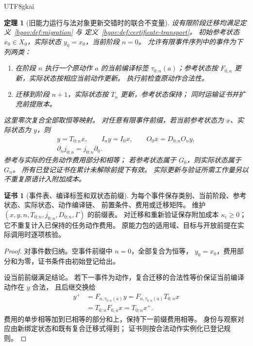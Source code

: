 \documentclass[12pt,a4paper,openany,notitlepage]{report}
\theoremstyle{plain}
\newtheorem{theorem}{定理}[chapter]
\theoremstyle{definition}
\newtheorem*{certificate}{证书}
\theoremstyle{remark}
\begin{document}
\begin{CJK*}{UTF8}{gkai}
\begin{theorem}[旧能力运行与法对象更新交错时的联合不变量]
\label{exp:gov:interleaved-governance}
设有限阶段迁移均满足定义~\ref{hgov:def:migration} 与
定义~\ref{hgov:def:certificate-transport}。
初始参考状态 $x_0\in X_0$，实际状态 $y_0=x_0$，当前阶段 $n=0$。
允许有限事件序列中的事件为下列两类：
\begin{enumerate}[label=(\roman*)]
\item 在阶段 $n$ 执行一个原动作 $a$ 的当前编译标签
$\tau_{0:n}(a)$；参考状态按 $F_{0,a}$ 更新，实际状态按相应当前动作更新。
执行前检查原动作合法性。
\item 迁移到阶段 $n+1$，实际状态按 $T_n$ 更新，参考状态保持；
同时运输证书并扩充前提账本。
\end{enumerate}
这里零次复合全部取恒等映射。
对任意有限事件前缀，若当前参考状态为 $x$、实际状态为 $y$，则
\[
\begin{gathered}
 y=T_{0:n}x,\qquad I_ny=I_0x,\qquad
 O_0x=D_{0:n}O_ny,\\
 \partial_nj_{0:n}=j_{0:n}\partial_0.
\end{gathered}
\]
参考与实际的任务动作费用部分和相等；
若参考状态属于 $G_0$，则实际状态属于 $G_n$。
所有已登记证书在累计未解除前提下有效。
实际更新与验证所需工作量另以不重复原语计入附加成本。
\end{theorem}
\begin{certificate}[事件表、编译标签和双状态前缀]
为每个事件保存类别、当前阶段、参考状态、实际状态、动作编译链、
前置条件、费用或迁移矩阵。
维护 $(x,y,n,T_{0:n},j_{0:n},D_{0:n},\Gamma)$ 的前缀表。
对迁移和重新验证保存附加成本 $\kappa_i\ge0$；
它不重复计入已保持的任务动作费用。
原能力包的适用域、目标与开放前提在实际调用时逐项核验。
\end{certificate}
\begin{proof}
对事件数归纳。空事件前缀中 $n=0$，全部复合为恒等，
$y_0=x_0$，费用部分和为零，证书条件由初始登记给出。

设当前前缀满足结论。
若下一事件为动作，复合迁移的合法性等价保证当前编译动作在 $y$ 合法，
且后继交换给
\[
\begin{aligned}
 y^+&=F_{n,\tau_{0:n}(a)}y
 =F_{n,\tau_{0:n}(a)}T_{0:n}x\\
 &=T_{0:n}F_{0,a}x=T_{0:n}x^+.
\end{aligned}
\]
费用的单步相等加到已相等的部分和上，保持下一前缀费用相等。
身份与观察对应由新绑定状态和既有复合迁移式得到；
证书则按合法动作实例化已登记规则。


\end{proof}
\end{CJK*}
\end{document}
